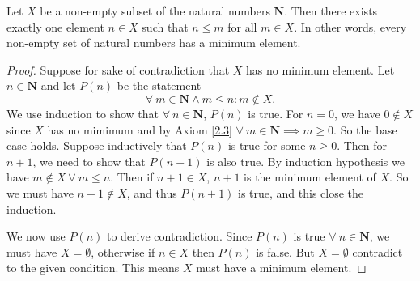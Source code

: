 \begin{proposition}\label{8.1.4}
Let \(X\) be a non-empty subset of the natural numbers \(\mathbf{N}\).
Then there exists exactly one element \(n \in X\) such that \(n \leq m\) for all \(m \in X\).
In other words, every non-empty set of natural numbers has a minimum element.
\end{proposition}

\begin{proof}
Suppose for sake of contradiction that \(X\) has no minimum element.
Let \(n \in \mathbf{N}\) and let \(P(n)\) be the statement
\[
    \forall\ m \in \mathbf{N} \land m \leq n : m \notin X.
\]
We use induction to show that \(\forall\ n \in \mathbf{N}\), \(P(n)\) is true.
For \(n = 0\), we have \(0 \notin X\) since \(X\) has no mimimum and by Axiom \ref{2.3} \(\forall\ m \in \mathbf{N} \implies m \geq 0\).
So the base case holds.
Suppose inductively that \(P(n)\) is true for some \(n \geq 0\).
Then for \(n + 1\), we need to show that \(P(n + 1)\) is also true.
By induction hypothesis we have \(m \notin X \ \forall\ m \leq n\).
Then if \(n + 1 \in X\), \(n + 1\) is the minimum element of \(X\).
So we must have \(n + 1 \notin X\), and thus \(P(n + 1)\) is true, and this close the induction.

We now use \(P(n)\) to derive contradiction.
Since \(P(n)\) is true \(\forall\ n \in \mathbf{N}\), we must have \(X = \emptyset\), otherwise if \(n \in X\) then \(P(n)\) is false.
But \(X = \emptyset\) contradict to the given condition.
This means \(X\) must have a minimum element.
\end{proof}